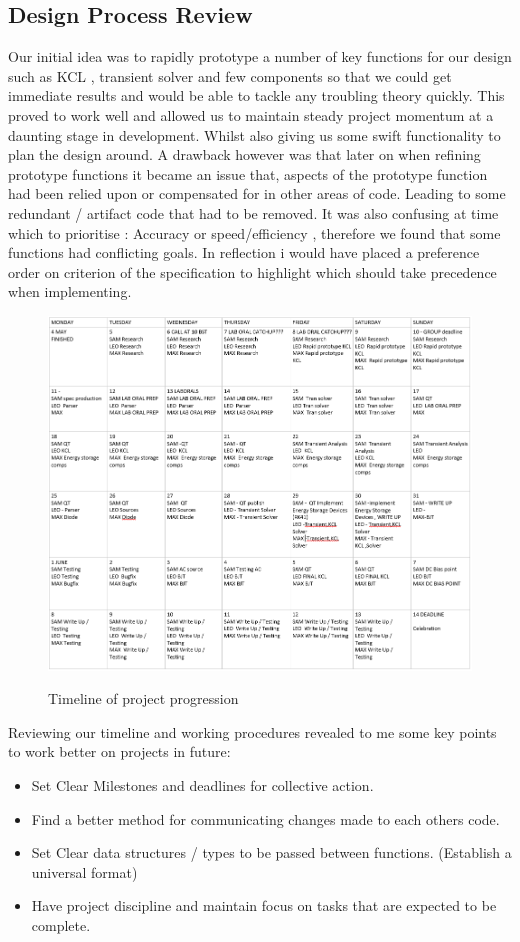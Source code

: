 \documentclass{article}
\begin{document}
\newpage
\subsection{Design Process Review}

Our initial idea was to rapidly prototype a number of key functions for our design such as KCL , transient solver and few components so that we could get immediate results and would be able to tackle any troubling theory quickly. This proved to work well and allowed us to maintain steady project momentum at a daunting stage in development. Whilst also giving us some swift functionality to  plan the design around.  A drawback however was that later on when refining prototype functions it became an issue that, aspects of the prototype function had been relied upon or compensated for in other areas of code. Leading to some redundant / artifact code that had to be removed.
\medbreak
It was also confusing at time which to prioritise : Accuracy or speed/efficiency , therefore we found that some functions had conflicting goals. In reflection i would have placed a preference order on criterion of the specification to highlight which should take precedence when implementing.  
\smallbreak
\begin{figure}[h]
    \caption{Timeline of project progression}
    \centering
    \includegraphics[width=0.6\linewidth]{images/Timeline.PNG}
    \label{fig:Timeline}
\end{figure}
Reviewing our timeline and working procedures revealed to me some key points to work better on projects in future:
\begin{itemize}
    \item Set Clear Milestones and deadlines for collective action.
    \item Find a better method for communicating changes made to each others code.
    \item Set Clear data structures / types to be passed between functions. (Establish a universal format)
    \item Have project discipline and maintain focus on tasks that are expected to be complete.
\end{itemize}
\newpage
\end{document}
